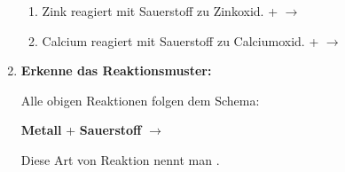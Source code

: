 \begin{enumerate}[label=\arabic*.]
\begin{enumerate}[label=\alph*)]
        \item Zink reagiert mit Sauerstoff zu Zinkoxid.
        \vspace{1cm}
        \underline{\hspace{4cm}} + \underline{\hspace{4cm}} $\rightarrow$ \underline{\hspace{4cm}}

        \item Calcium reagiert mit Sauerstoff zu Calciumoxid.
        \vspace{1cm}
        \underline{\hspace{4cm}} + \underline{\hspace{4cm}} $\rightarrow$ \underline{\hspace{4cm}}
    \end{enumerate}

    \vspace{1cm}

    \item \textbf{Erkenne das Reaktionsmuster:}
    \vspace{0.5cm}

    Alle obigen Reaktionen folgen dem Schema:

    \textbf{Metall} + \textbf{Sauerstoff} $\rightarrow$ \textbf{\underline{\hspace{4cm}}}

    Diese Art von Reaktion nennt man \underline{\hspace{4cm}}.

\end{enumerate}